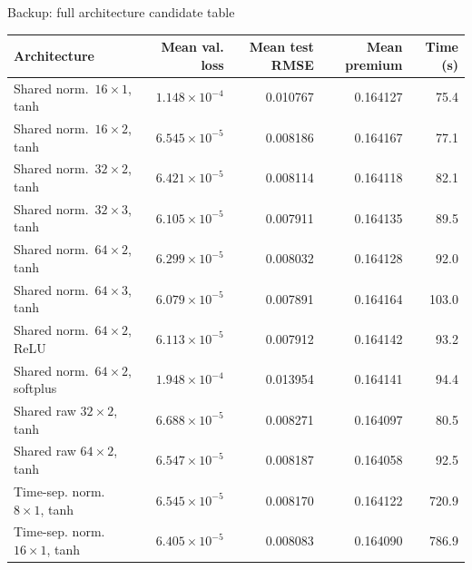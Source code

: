 \begin{frame}[t]{Backup: full architecture candidate table}
  \centering
  \fontsize{6.7}{7.7}\selectfont
  \setlength{\tabcolsep}{3.2pt}
  \begin{tabular}{lrrrr}
    \toprule
    Architecture & Mean val. loss & Mean test RMSE & Mean premium & Time (s)\\
    \midrule
    Shared norm.\ \(16{\times}1\), tanh & \(1.148\times10^{-4}\) & 0.010767 & 0.164127 & 75.4\\
    Shared norm.\ \(16{\times}2\), tanh & \(6.545\times10^{-5}\) & 0.008186 & 0.164167 & 77.1\\
    Shared norm.\ \(32{\times}2\), tanh & \(6.421\times10^{-5}\) & 0.008114 & 0.164118 & 82.1\\
    Shared norm.\ \(32{\times}3\), tanh & \(6.105\times10^{-5}\) & 0.007911 & 0.164135 & 89.5\\
    Shared norm.\ \(64{\times}2\), tanh & \(6.299\times10^{-5}\) & 0.008032 & 0.164128 & 92.0\\
    \rowcolor{Teal!12}Shared norm.\ \(64{\times}3\), tanh & \(6.079\times10^{-5}\) & 0.007891 & 0.164164 & 103.0\\
    Shared norm.\ \(64{\times}2\), ReLU & \(6.113\times10^{-5}\) & 0.007912 & 0.164142 & 93.2\\
    Shared norm.\ \(64{\times}2\), softplus & \(1.948\times10^{-4}\) & 0.013954 & 0.164141 & 94.4\\
    Shared raw \(32{\times}2\), tanh & \(6.688\times10^{-5}\) & 0.008271 & 0.164097 & 80.5\\
    Shared raw \(64{\times}2\), tanh & \(6.547\times10^{-5}\) & 0.008187 & 0.164058 & 92.5\\
    Time-sep. norm.\ \(8{\times}1\), tanh & \(6.545\times10^{-5}\) & 0.008170 & 0.164122 & 720.9\\
    Time-sep. norm.\ \(16{\times}1\), tanh & \(6.405\times10^{-5}\) & 0.008083 & 0.164090 & 786.9\\
    \bottomrule
  \end{tabular}
  \vspace{0.14cm}
\end{frame}



